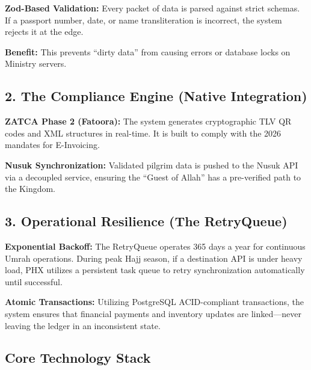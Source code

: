 \documentclass[11pt,a4paper]{article}
\begin{document}
\textbf{Zod-Based Validation:} Every packet of data is parsed against strict schemas. If a passport number, date, or name transliteration is incorrect, the system rejects it at the edge.

\vspace{0.3cm}

\textbf{Benefit:} This prevents ``dirty data'' from causing errors or database locks on Ministry servers.

\subsection*{2. The Compliance Engine (Native Integration)}

\textbf{ZATCA Phase 2 (Fatoora):} The system generates cryptographic TLV QR codes and XML structures in real-time. It is built to comply with the 2026 mandates for E-Invoicing.

\vspace{0.3cm}

\textbf{Nusuk Synchronization:} Validated pilgrim data is pushed to the Nusuk API via a decoupled service, ensuring the ``Guest of Allah'' has a pre-verified path to the Kingdom.

\subsection*{3. Operational Resilience (The RetryQueue)}

\textbf{Exponential Backoff:} The RetryQueue operates 365 days a year for continuous Umrah operations. During peak Hajj season, if a destination API is under heavy load, PHX utilizes a persistent task queue to retry synchronization automatically until successful.

\vspace{0.3cm}

\textbf{Atomic Transactions:} Utilizing PostgreSQL ACID-compliant transactions, the system ensures that financial payments and inventory updates are linked---never leaving the ledger in an inconsistent state.

\subsection*{Core Technology Stack}
\end{document}

